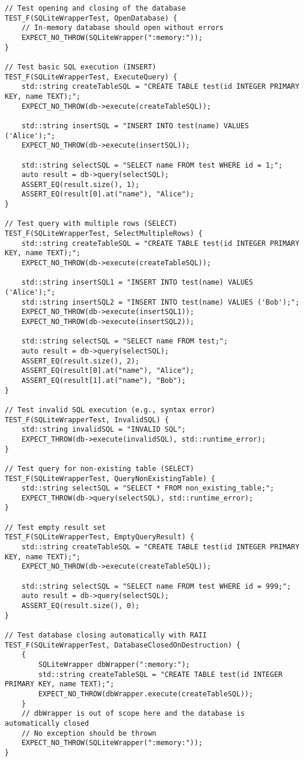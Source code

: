 \begin{verbatim}
// Test opening and closing of the database
TEST_F(SQLiteWrapperTest, OpenDatabase) {
    // In-memory database should open without errors
    EXPECT_NO_THROW(SQLiteWrapper(":memory:"));
}

// Test basic SQL execution (INSERT)
TEST_F(SQLiteWrapperTest, ExecuteQuery) {
    std::string createTableSQL = "CREATE TABLE test(id INTEGER PRIMARY KEY, name TEXT);";
    EXPECT_NO_THROW(db->execute(createTableSQL));

    std::string insertSQL = "INSERT INTO test(name) VALUES ('Alice');";
    EXPECT_NO_THROW(db->execute(insertSQL));

    std::string selectSQL = "SELECT name FROM test WHERE id = 1;";
    auto result = db->query(selectSQL);
    ASSERT_EQ(result.size(), 1);
    ASSERT_EQ(result[0].at("name"), "Alice");
}

// Test query with multiple rows (SELECT)
TEST_F(SQLiteWrapperTest, SelectMultipleRows) {
    std::string createTableSQL = "CREATE TABLE test(id INTEGER PRIMARY KEY, name TEXT);";
    EXPECT_NO_THROW(db->execute(createTableSQL));

    std::string insertSQL1 = "INSERT INTO test(name) VALUES ('Alice');";
    std::string insertSQL2 = "INSERT INTO test(name) VALUES ('Bob');";
    EXPECT_NO_THROW(db->execute(insertSQL1));
    EXPECT_NO_THROW(db->execute(insertSQL2));

    std::string selectSQL = "SELECT name FROM test;";
    auto result = db->query(selectSQL);
    ASSERT_EQ(result.size(), 2);
    ASSERT_EQ(result[0].at("name"), "Alice");
    ASSERT_EQ(result[1].at("name"), "Bob");
}

// Test invalid SQL execution (e.g., syntax error)
TEST_F(SQLiteWrapperTest, InvalidSQL) {
    std::string invalidSQL = "INVALID SQL";
    EXPECT_THROW(db->execute(invalidSQL), std::runtime_error);
}

// Test query for non-existing table (SELECT)
TEST_F(SQLiteWrapperTest, QueryNonExistingTable) {
    std::string selectSQL = "SELECT * FROM non_existing_table;";
    EXPECT_THROW(db->query(selectSQL), std::runtime_error);
}

// Test empty result set
TEST_F(SQLiteWrapperTest, EmptyQueryResult) {
    std::string createTableSQL = "CREATE TABLE test(id INTEGER PRIMARY KEY, name TEXT);";
    EXPECT_NO_THROW(db->execute(createTableSQL));

    std::string selectSQL = "SELECT name FROM test WHERE id = 999;";
    auto result = db->query(selectSQL);
    ASSERT_EQ(result.size(), 0);
}

// Test database closing automatically with RAII
TEST_F(SQLiteWrapperTest, DatabaseClosedOnDestruction) {
    {
        SQLiteWrapper dbWrapper(":memory:");
        std::string createTableSQL = "CREATE TABLE test(id INTEGER PRIMARY KEY, name TEXT);";
        EXPECT_NO_THROW(dbWrapper.execute(createTableSQL));
    }
    // dbWrapper is out of scope here and the database is automatically closed
    // No exception should be thrown
    EXPECT_NO_THROW(SQLiteWrapper(":memory:"));
}
\end{verbatim}


